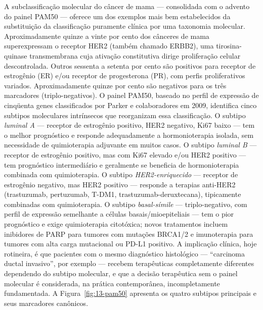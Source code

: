 A subclassificação molecular do câncer de mama --- consolidada com o advento do painel PAM50 --- oferece um dos exemplos mais bem estabelecidos da substituição da classificação puramente clínica por uma taxonomia molecular. Aproximadamente quinze a vinte por cento dos cânceres de mama superexpressam o receptor HER2 (também chamado ERBB2), uma tirosina-quinase transmembrana cuja ativação constitutiva dirige proliferação celular descontrolada. Outros sessenta a setenta por cento são positivos para receptor de estrogênio (ER) e/ou receptor de progesterona (PR), com perfis proliferativos variados. Aproximadamente quinze por cento são negativos para os três marcadores (triplo-negativos). O painel PAM50, baseado no perfil de expressão de cinqüenta genes classificados por Parker e colaboradores em 2009, identifica cinco subtipos moleculares intrínsecos que reorganizam essa classificação. O subtipo \emph{luminal A} --- receptor de estrogênio positivo, HER2 negativo, Ki67 baixo --- tem o melhor prognóstico e responde adequadamente a hormonioterapia isolada, sem necessidade de quimioterapia adjuvante em muitos casos. O subtipo \emph{luminal B} --- receptor de estrogênio positivo, mas com Ki67 elevado e/ou HER2 positivo --- tem prognóstico intermediário e geralmente se beneficia de hormonioterapia combinada com quimioterapia. O subtipo \emph{HER2-enriquecido} --- receptor de estrogênio negativo, mas HER2 positivo --- responde a terapias anti-HER2 (trastuzumab, pertuzumab, T-DM1, trastuzumab-deruxtecana), tipicamente combinadas com quimioterapia. O subtipo \emph{basal-símile} --- triplo-negativo, com perfil de expressão semelhante a células basais/mioepiteliais --- tem o pior prognóstico e exige quimioterapia citotóxica; novos tratamentos incluem inibidores de PARP para tumores com mutações BRCA1/2 e imunoterapia para tumores com alta carga mutacional ou PD-L1 positivo. A implicação clínica, hoje rotineira, é que pacientes com o mesmo diagnóstico histológico --- ``carcinoma ductal invasivo'', por exemplo --- recebem terapêuticas completamente diferentes dependendo do subtipo molecular, e que a decisão terapêutica sem o painel molecular é considerada, na prática contemporânea, incompletamente fundamentada. A Figura~\ref{fig:13-pam50} apresenta os quatro subtipos principais e seus marcadores canônicos.

